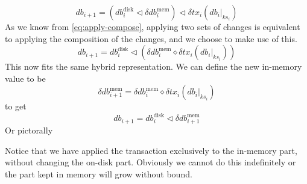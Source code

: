 \documentclass[11pt,a4paper]{article}
\newcommand\restrict[2]{\left.#1\right|_{#2}}
\begin{document}
\[
\mathit{db}_{i+1} = \left( \mathit{db}^{\mathrm{disk}}_i \triangleleft \delta\mathit{db}^{\mathrm{mem}}_i \right)
      \triangleleft \delta\mathit{tx}_i(\restrict{\mathit{db}_i}{\mathit{ks}_i})
\]
As we know from \cref{eq:apply-compose}, applying two sets of changes is
equivalent to applying the composition of the changes, and we choose to make
use of this.
\[
\mathit{db}_{i+1} = \mathit{db}^{\mathrm{disk}}_i
      \triangleleft \left( \delta\mathit{db}^{\mathrm{mem}}_i
                  \diamond \delta\mathit{tx}_i(\restrict{\mathit{db}_i}{\mathit{ks}_i})
                    \right)
\]
This now fits the same hybrid representation. We can define the new in-memory
value to be
\[
\delta\mathit{db}^{\mathrm{mem}}_{i+1} = \delta\mathit{db}^{\mathrm{mem}}_i
                  \diamond \delta\mathit{tx}_i(\restrict{\mathit{db}_i}{\mathit{ks}_i})
\]
to get
\[
\mathit{db}_{i+1} = \mathit{db}^{\mathrm{disk}}_i
      \triangleleft \delta\mathit{db}^{\mathrm{mem}}_{i+1}
\]
Or pictorally
\begin{center}
\end{center}
Notice that we have applied the transaction exclusively to the in-memory part,
without changing the on-disk part. Obviously we cannot do this indefinitely or
the part kept in memory will grow without bound.
\end{document}
